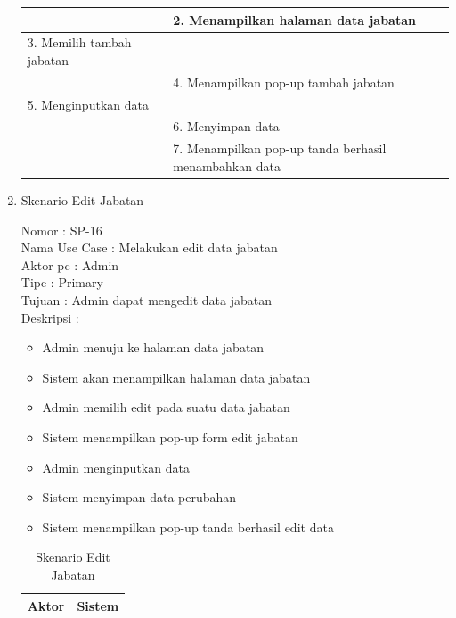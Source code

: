\begin{enumerate}
\begin{table}
\begin{tabular}{ | l | p{68.5mm} |}
		\hline
		
		&  2.	Menampilkan halaman data jabatan \\
		
		\hline
		
		3. Memilih tambah jabatan & \\
		
		\hline
		
		& 4.	Menampilkan pop-up tambah jabatan \\
		
		\hline
		
		5.	Menginputkan data  & \\
		\hline
		
		& 6.	Menyimpan data \\
		\hline
		
		& 7.	Menampilkan pop-up tanda berhasil menambahkan data \\
		\hline
		
	\end{tabular}
\end{table}

\item Skenario Edit Jabatan

Nomor \kern 3.6pc : SP-16 \\
Nama Use Case : Melakukan edit data jabatan \\
Aktor  pc : Admin \\
Tipe \kern 4.6pc : Primary \\
Tujuan \kern 3.6pc : Admin dapat mengedit data jabatan \\
Deskripsi \kern 2.5pc : 

\begin{itemize}
	\item Admin menuju ke halaman data jabatan
	\item Sistem akan menampilkan halaman data jabatan
	\item Admin memilih edit pada suatu data jabatan
	\item Sistem menampilkan pop-up form edit jabatan
	\item Admin menginputkan data
	\item Sistem menyimpan data perubahan
	\item Sistem menampilkan pop-up tanda berhasil edit data
	
\end{itemize}

\begin{table}
	\caption{Skenario Edit Jabatan}
	\centering
	\begin{tabular}{ | p{58mm} | p{70mm} |}
		\hline 
		\textbf{Aktor} & \textbf{Sistem} \\
		\hline
		

\end{tabular}
\end{table}
\end{enumerate}
